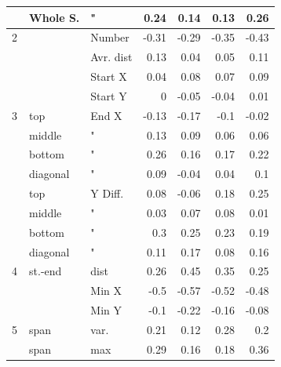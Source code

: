 \documentclass{sigchi}
\begin{document}
\begin{table}[ht]
\begin{tabular}{|lll|rrrr|}
    ~    & Whole S.   & "         & 0.24  & 0.14   & 0.13   & 0.26  \\ \hline
    2    & ~          & Number    & -0.31 & -0.29  & -0.35  & \cellcolor[gray]{0.9}-0.43 \\
    ~    & ~          & Avr. dist & 0.13  & 0.04   & 0.05   & 0.11  \\
    ~    & ~          & Start X   & 0.04  & 0.08   & 0.07   & 0.09  \\
    ~    & ~          & Start Y   & 0     & -0.05  & -0.04  & 0.01  \\ \hline
    3    & top  			& End X     & -0.13 & -0.17  & -0.1   & -0.02 \\
    ~    & middle  		& "         & 0.13  & 0.09   & 0.06   & 0.06  \\
    ~    & bottom 		& "         & 0.26  & 0.16   & 0.17   & 0.22  \\
    ~    & diagonal 	& "         & 0.09  & -0.04  & 0.04   & 0.1   \\
    ~    & top  			& Y Diff.   & 0.08  & -0.06		& 0.18   & 0.25  \\
    ~    & middle  		& "         & 0.03  & 0.07   & 0.08   & 0.01  \\
    ~    & bottom 		& "         & 0.3   & 0.25   & 0.23   & 0.19  \\
    ~    & diagonal 	& "         & 0.11  & 0.17   & 0.08   & 0.16  \\ \hline
    4    & st.-end   	& dist      & 0.26  & \cellcolor[gray]{0.9}0.45   & 0.35   & 0.25  \\
    ~    & ~          & Min X     & -0.5  & \cellcolor[gray]{0.9}-0.57  & -0.52  & -0.48 \\
    ~    & ~          & Min Y     & -0.1  & -0.22  & -0.16  & -0.08 \\ \hline
    5    & span       & var.      & 0.21  & 0.12   & 0.28   & 0.2   \\
    ~    & span       & max       & 0.29  & 0.16   & 0.18   & \cellcolor[gray]{0.9}0.36  \\ \hline
    \end{tabular}
\end{table}
\end{document}
